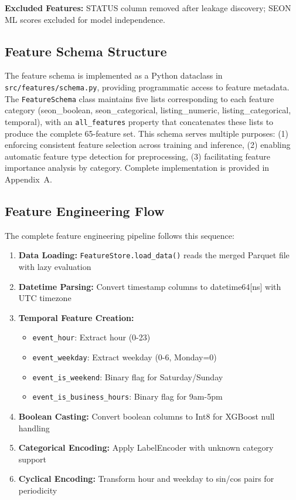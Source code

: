 \textbf{Excluded Features:} STATUS column removed after leakage discovery; SEON ML scores excluded for model independence.

\subsection{Feature Schema Structure}
\label{sec:4_4_3}

The feature schema is implemented as a Python dataclass in \texttt{src/features/schema.py}, providing programmatic access to feature metadata. The \texttt{FeatureSchema} class maintains five lists corresponding to each feature category (seon\_boolean, seon\_categorical, listing\_numeric, listing\_categorical, temporal), with an \texttt{all\_features} property that concatenates these lists to produce the complete 65-feature set. This schema serves multiple purposes: (1) enforcing consistent feature selection across training and inference, (2) enabling automatic feature type detection for preprocessing, (3) facilitating feature importance analysis by category. Complete implementation is provided in Appendix~A.

\subsection{Feature Engineering Flow}

The complete feature engineering pipeline follows this sequence:

\begin{enumerate}
    \item \textbf{Data Loading:} \texttt{FeatureStore.load\_data()} reads the merged Parquet file with lazy evaluation
    \item \textbf{Datetime Parsing:} Convert timestamp columns to datetime64[ns] with UTC timezone
    \item \textbf{Temporal Feature Creation:}
    \begin{itemize}
        \item \texttt{event\_hour}: Extract hour (0-23)
        \item \texttt{event\_weekday}: Extract weekday (0-6, Monday=0)
        \item \texttt{event\_is\_weekend}: Binary flag for Saturday/Sunday
        \item \texttt{event\_is\_business\_hours}: Binary flag for 9am-5pm
    \end{itemize}
    \item \textbf{Boolean Casting:} Convert boolean columns to Int8 for XGBoost null handling
    \item \textbf{Categorical Encoding:} Apply LabelEncoder with unknown category support
    \item \textbf{Cyclical Encoding:} Transform hour and weekday to sin/cos pairs for periodicity
\end{enumerate}

